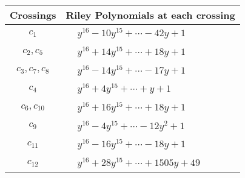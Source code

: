 \documentclass[1p]{elsarticle_modified}
\theoremstyle{definition}
\begin{document}
\begin{tabular}{m{50pt}|m{274pt}}
Crossings & \hspace{64pt}Riley Polynomials at each crossing \\
\hline $$\begin{aligned}c_{1}\end{aligned}$$&$\begin{aligned}
&y^{16}-10 y^{15}+\cdots-42 y+1
\end{aligned}$\\
\hline $$\begin{aligned}c_{2},c_{5}\end{aligned}$$&$\begin{aligned}
&y^{16}+14 y^{15}+\cdots+18 y+1
\end{aligned}$\\
\hline $$\begin{aligned}c_{3},c_{7},c_{8}\end{aligned}$$&$\begin{aligned}
&y^{16}-14 y^{15}+\cdots-17 y+1
\end{aligned}$\\
\hline $$\begin{aligned}c_{4}\end{aligned}$$&$\begin{aligned}
&y^{16}+4 y^{15}+\cdots+y+1
\end{aligned}$\\
\hline $$\begin{aligned}c_{6},c_{10}\end{aligned}$$&$\begin{aligned}
&y^{16}+16 y^{15}+\cdots+18 y+1
\end{aligned}$\\
\hline $$\begin{aligned}c_{9}\end{aligned}$$&$\begin{aligned}
&y^{16}-4 y^{15}+\cdots-12 y^2+1
\end{aligned}$\\
\hline $$\begin{aligned}c_{11}\end{aligned}$$&$\begin{aligned}
&y^{16}-16 y^{15}+\cdots-18 y+1
\end{aligned}$\\
\hline $$\begin{aligned}c_{12}\end{aligned}$$&$\begin{aligned}
&y^{16}+28 y^{15}+\cdots+1505 y+49
\end{aligned}$\\
\hline
\end{tabular}\\~\\
\end{document}
